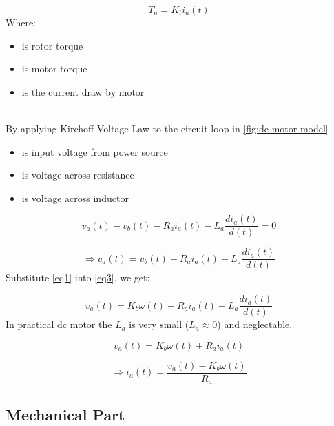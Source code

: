 \documentclass[12pt,a4paper]{article}
\begin{document}
	\begin{equation}
		T_a = K_t i_a(t)
		\label{eq2}
	\end{equation}
	Where:
	\begin{itemize}
		\item { is rotor torque }
		\item { is motor torque}
		\item { is the current draw by motor}
	\end{itemize}
	\hfill\\
	By applying Kirchoff Voltage Law to the circuit loop in \autoref{fig:dc motor model}
	\begin{itemize}
		\item { is input voltage from power source}
		\item { is voltage across resistance}
		\item { is voltage across inductor}
	\end{itemize}
	
	\[v_a(t) - v_b(t) - R_a i_a(t) - L_a \frac{di_a(t)}{d(t)} = 0\]
	
	\begin{equation}
		\Rightarrow v_a(t) = v_b(t) + R_a i_a(t) + L_a \frac{di_a(t)}{d(t)}
		\label{eq3}
	\end{equation}
	Substitute \autoref{eq1} into \autoref{eq3}, we get:
	
	\begin{equation}
		v_a(t) = K_b \omega(t) + R_a i_a(t) + L_a \frac{di_a(t)}{d(t)}
		\label{eq4}
	\end{equation}
	In practical dc motor the \(L_a\) is very small (\(L_a \approx 0\)) and neglectable.
	
	\[v_a(t) = K_b \omega(t) + R_a i_a(t)\]
	
	\begin{equation}
		\Rightarrow \boxed{i_a(t) = \frac{v_a(t) - K_b \omega(t)}{R_a}}
		\label{eq5}
	\end{equation}
	
	\subsection{Mechanical Part}
	
\end{document}
